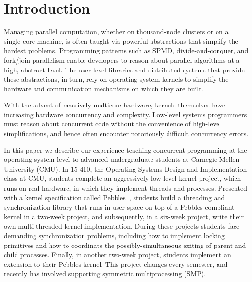 \section{Introduction}

Managing parallel computation, whether on thousand-node clusters or on a single-core machine, is often taught via powerful abstractions that simplify the hardest problems.
Programming patterns such as SPMD, divide-and-conquer, and fork/join parallelism enable developers to reason about parallel algorithms at a high, abstract level.
The user-level libraries and distributed systems that provide these abstractions, in turn, rely on operating system kernels to simplify the hardware and communication mechanisms on which they are built. %

With the advent of massively multicore hardware,
kernels themselves have increasing hardware concurrency and complexity. %
Low-level systems programmers must reason about concurrent code without the convenience of high-level simplifications, and hence often encounter notoriously difficult concurrency errors.

In this paper we describe our experience teaching concurrent programming at the operating-system level to advanced undergraduate students at Carnegie Mellon University (CMU).
In 15-410, the Operating Systems Design and Implementation class at CMU, students complete an aggressively low-level kernel project, which runs on real hardware, in which they implement threads and processes.
Presented with a kernel specification called Pebbles~\cite{kspec}, students build a threading and synchronization library that runs in user space on top of a Pebbles-compliant kernel in a two-week project, and subsequently, in a six-week project, write their own multi-threaded kernel implementation.
During these projects students face demanding synchronization problems, including how to implement locking primitives and how to coordinate the possibly-simultaneous exiting of parent and child processes.
Finally, in another two-week project, students implement an extension to their Pebbles kernel. This project changes every semester, and recently has involved supporting symmetric multiprocessing (SMP).

